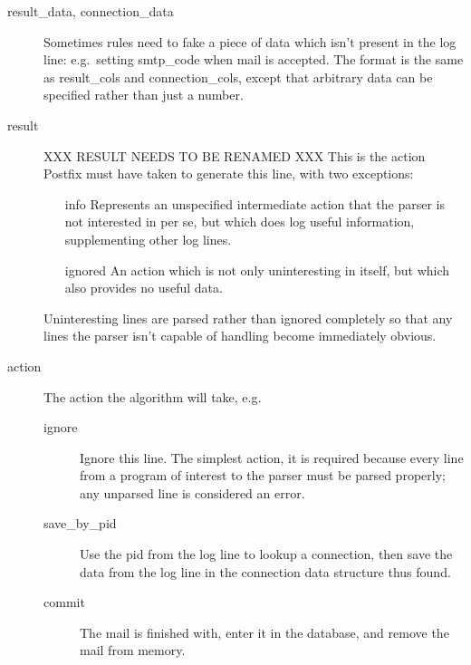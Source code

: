 \documentclass[a4paper,12pt,draft]{article}
\begin{document}
\begin{description}
    \item [result\_data, connection\_data] Sometimes rules need to fake a
        piece of data which isn't present in the log line: e.g.\ setting
        smtp\_code when mail is accepted.  The format is the same as
        result\_cols and connection\_cols, except that arbitrary data can
        be specified rather than just a number.

    \item [result]  XXX RESULT NEEDS TO BE RENAMED XXX This is the action
        Postfix must have taken to generate this line, with two exceptions:

        \begin{itemize}

            \item [info] Represents an unspecified intermediate action that
                the parser is not interested in per se, but which does log
                useful information, supplementing other log lines.

            \item [ignored] An action which is not only uninteresting in
                itself, but which also provides no useful data.

        \end{itemize}

        Uninteresting lines are parsed rather than ignored completely so
        that any lines the parser isn't capable of handling become
        immediately obvious.

    \item [action] The action the algorithm will take, e.g.
        \begin{description}

            \item [ignore] Ignore this line.  The simplest action, it is
                required because every line from a program of interest to
                the parser must be parsed properly; any unparsed line is
                considered an error.

            \item [save\_by\_pid] Use the pid from the log line to lookup a
                connection, then save the data from the log line in the
                connection data structure thus found.

            \item [commit] The mail is finished with, enter it in the
                database, and remove the mail from memory.


\end{description}
\end{description}
\end{document}

